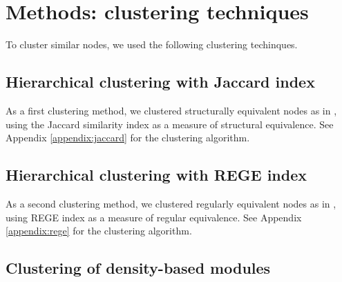 \documentclass[twocolumn]{article}
\begin{document}

\section*{Methods: clustering techniques}

	To cluster similar nodes, we used the following clustering techinques.

	\subsection*{Hierarchical clustering with Jaccard index}

		As a first clustering method, we clustered structurally equivalent nodes as in \citet{Yodzis1999}, using the Jaccard similarity index as a measure of structural equivalence. See Appendix \ref{appendix:jaccard} for the clustering algorithm.

	\subsection*{Hierarchical clustering with REGE index}

		As a second clustering method, we clustered regularly equivalent nodes as in \citet{Luczkovich2003}, using REGE index as a measure of regular equivalence. See Appendix \ref{appendix:rege} for the clustering algorithm.

	\subsection*{Clustering of density-based modules}
\end{document}
